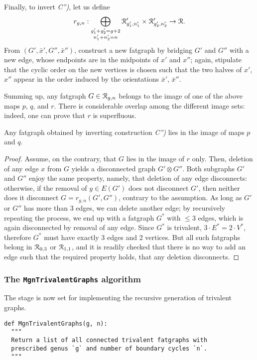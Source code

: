 Finally, to invert {\slshape C'')}, let us define
\begin{equation*}
r_{g,n}: \bigoplus_{\substack{g'_1+g'_2=g+2 \\ n'_1+n'_2=n}} 
\mathcal{R}'_{g'_1, n'_1} \times \mathcal{R}'_{g'_2, n'_2} \to \mathcal{R}.
\end{equation*}
From $(G', \bar{x}', G'',
\bar{x}'')$, construct a new fatgraph by bridging $G'$ and $G''$ with
a new edge, whose endpoints are in the midpoints of $x'$ and $x''$;
again, stipulate that the cyclic order on the new vertices is chosen
such that the two halves of $x'$, $x''$ appear in the order induced by
the orientations $\bar{x}'$, $\bar{x}''$.

Summing up, any fatgraph $G \in \mathcal{R}_{g,n}$ belongs to the image of one
of the above maps $p$, $q$, and $r$. There is considerable
overlap among the different image sets: indeed, one can prove that
$r$ is superfluous.
\begin{lemma}\label{lemma:no-c2}
  Any fatgraph obtained by inverting construction {\slshape C'')} lies in
  the image of maps $p$ and $q$.
\end{lemma}
\begin{proof}
  Assume, on the contrary, that $G$ lies in the image of $r$ only.
  Then, deletion of any edge $x$ from $G$ yields a disconnected graph
  $G' \otimes G''$.  Both subgraphs $G'$ and $G''$ enjoy the same
  property, namely, that deletion of any edge disconnects: otherwise,
  if the removal of $y \in E(G')$ does not disconnect $G'$, then
  neither does it disconnect $G = r_{g,n}(G', G'')$, contrary to the
  assumption. As long as $G'$ or $G''$ has more than 3 edges, we can
  delete another edge; by recursively repeating the process, we end up
  with a fatgraph $G^*$ with $\leq 3$ edges, which is again
  disconnected by removal of any edge.  Since $G^*$ is trivalent, $3
  \cdot E^* = 2 \cdot V^*$, therefore $G^*$ must have exactly 3 edges
  and 2 vertices. But all such fatgraphs belong in $\mathcal{R}_{0,3}$ or
  $\mathcal{R}_{1,1}$, and it is readily checked that there is no way to add an
  edge such that the required property holds, that any deletion
  disconnects.
\end{proof}

\subsubsection{The \protect\Verb`MgnTrivalentGraphs` algorithm}
\label{sec:MgnTrivalentGraphs}

The stage is now set for implementing the recursive generation of
trivalent graphs.
\begin{lstlisting}[name=MgnTrivalentGraphs,firstnumber=1]
def MgnTrivalentGraphs(g, n):
  """
  Return a list of all connected trivalent fatgraphs with
  prescribed genus `g` and number of boundary cycles `n`.
  """
\end{lstlisting}

